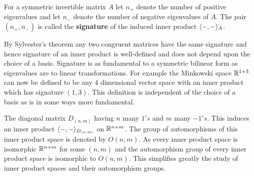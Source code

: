 \begin{definition}
	For a symmetric invertible matrix $A$ let $n_+$ denote the number of positive eigenvalues and let $n_-$ denote the number of negative eigenvalues of $A$. The pair $(n_+,n_-)$ is called the \textbf{signature} of the induced inner product $\langle -, - \rangle_A$.
\end{definition}

By Sylvester's theorem any two congruent matrices have the same signature and hence signature of an inner product is well-defined and does not depend upon the choice of a basis. Signature is as fundamental to a symmetric bilinear form as eigenvalues are to linear transformations. For example the Minkowski space $\mathbb{R}^{1+3}$ can now be defined to be any 4 dimensional vector space with an inner product which has signature $(1,3)$. This definition is independent of the choice of a basis as is in some ways more fundamental.

The diagonal matrix $D_{(n,m)}$ having $n$ many $1's$ and $m$ many $-1's$. This induces an inner product $\langle -, - \rangle_{D_{(n,m)}}$ on $\mathbb{R}^{n+m}$. The group of automorphisms of this inner product space is denoted by $O(n,m)$. As every inner product space is isomorphic $\mathbb{R}^{n+m}$ for some $(n,m)$ and the automorphism group of every inner product space is isomorphic to $O(n,m)$. This simplifies greatly the study of inner product spaces and their automorphism groups.








